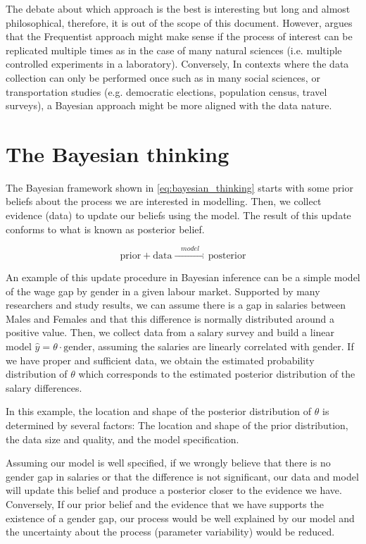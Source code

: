 The debate about which approach is the best is interesting but 
long and almost philosophical, therefore, it is out of the 
scope of this document. However, \citet{Lambert2018} argues 
that the Frequentist approach might
make sense if the process of interest can be replicated 
multiple times as in the case of many natural sciences 
(i.e. multiple controlled experiments in a laboratory). 
Conversely, In contexts where the data collection can only be performed 
once such as in many social sciences, or transportation 
studies (e.g. democratic elections, population census, 
travel surveys), a Bayesian approach might be more aligned 
with the data nature.

\section{The Bayesian thinking}

The Bayesian framework shown in \cref{eq:bayesian_thinking} starts with some prior beliefs about the 
process we are interested in modelling. Then, 
we collect evidence (data) to update our beliefs 
using the model. The result of this update conforms 
to what is known as posterior belief.

\begin{equation}\label{eq:bayesian_thinking}
    \text{prior} + \text{data} \xrightarrow{\ \ \ \ model\ \ \ \ } \text{posterior}
\end{equation}

An example of this update procedure in Bayesian inference
 can be a simple model of the wage gap by gender in a 
 given labour market. Supported by many researchers and 
 study results, we can assume there is a gap in salaries 
 between Males and Females and that this difference is 
 normally distributed around a positive value. Then, 
 we collect data from a salary survey and build a linear 
 model $\hat{y}=\theta\cdot\text{gender}$, assuming the 
 salaries are linearly correlated with gender. If we have 
 proper and sufficient data, we obtain the estimated 
 probability distribution of $\theta$ which corresponds to 
 the estimated posterior distribution of the salary differences.

In this example, the location and shape of the posterior
 distribution of $\theta$ is determined by several 
 factors: The location and shape of the prior distribution, 
 the data size and quality, and the model specification.

Assuming our model is well specified, if we wrongly 
believe that there is no gender gap in salaries or 
that the difference is not significant, our data and 
model will update this belief and produce a posterior 
closer to the evidence we have. Conversely, If our prior 
belief and the evidence that we have supports the 
existence of a gender gap, our process would be well 
explained by our model and the uncertainty about the 
process (parameter variability) would be reduced.



